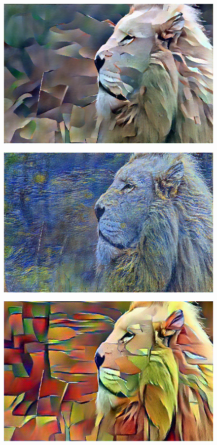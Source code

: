 \documentclass[17pt]{extarticle}
\begin{document}
\begin{figure}
  \includegraphics[scale=0.7]{lionpolyfoxstyle.png}
\end{figure}
\begin{figure}
  \includegraphics[scale=0.7]{lionstarrynight.png}
\end{figure}
\begin{figure}
  \includegraphics[scale=0.93]{lioncubism.png}
\end{figure}
\end{document}
